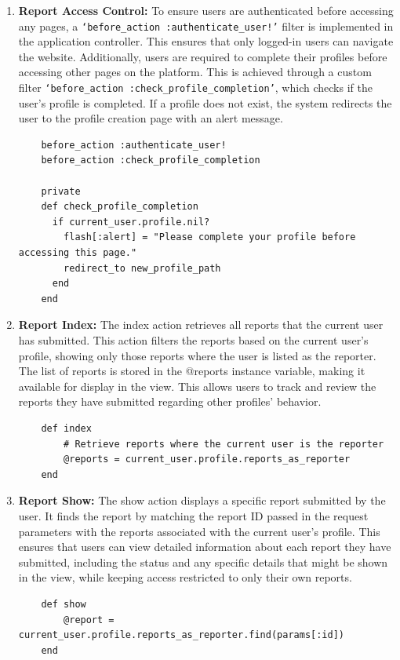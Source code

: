     \begin{enumerate}
    \item \textbf{Report Access Control:} 
    To ensure users are authenticated before accessing any pages, a \texttt{`before\_action :authenticate\_user!'} filter is implemented in the application controller. This ensures that only logged-in users can navigate the website. Additionally, users are required to complete their profiles before accessing other pages on the platform. This is achieved through a custom filter \texttt{`before\_action :check\_profile\_completion'}, which checks if the user’s profile is completed. If a profile does not exist, the system redirects the user to the profile creation page with an alert message.
    \begin{lstlisting}
    before_action :authenticate_user!
    before_action :check_profile_completion
    
    private
    def check_profile_completion
      if current_user.profile.nil?
        flash[:alert] = "Please complete your profile before accessing this page."
        redirect_to new_profile_path
      end
    end
    \end{lstlisting}

    \newpage
    \item \textbf{Report Index:} 
    The index action retrieves all reports that the current user has submitted. This action filters the reports based on the current user’s profile, showing only those reports where the user is listed as the reporter. The list of reports is stored in the @reports instance variable, making it available for display in the view. This allows users to track and review the reports they have submitted regarding other profiles’ behavior.
    \begin{lstlisting}
    def index
        # Retrieve reports where the current user is the reporter
        @reports = current_user.profile.reports_as_reporter
    end
    \end{lstlisting}

    \item \textbf{Report Show:} 
     The show action displays a specific report submitted by the user. It finds the report by matching the report ID passed in the request parameters with the reports associated with the current user’s profile. This ensures that users can view detailed information about each report they have submitted, including the status and any specific details that might be shown in the view, while keeping access restricted to only their own reports.
    \begin{lstlisting}
    def show
        @report = current_user.profile.reports_as_reporter.find(params[:id])
    end
    \end{lstlisting}


\end{enumerate}
